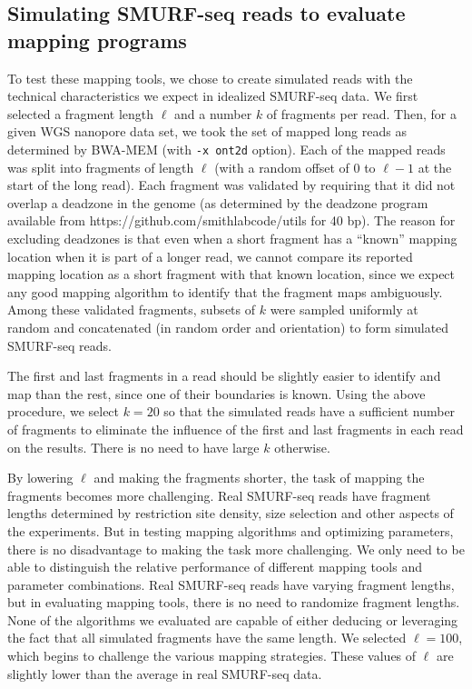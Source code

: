 \subsection{Simulating SMURF-seq reads to evaluate mapping programs}
To test these mapping tools, we chose to create simulated reads with the
technical characteristics we expect in idealized SMURF-seq data. We
first selected a fragment length $\ell$ and a number $k$ of fragments
per read. Then, for a given WGS nanopore data set, we took the set of
mapped long reads as determined by BWA-MEM (with \texttt{-x ont2d}
option).
Each of the mapped reads was split into fragments of length $\ell$ (with
a random offset of $0$ to $\ell-1$ at the start of the long read). Each
fragment was validated by requiring that it did not overlap a deadzone
in the genome (as determined by the deadzone program available from
https://github.com/smithlabcode/utils for 40 bp). The reason for
excluding deadzones is that even when a short fragment has a ``known''
mapping location when it is part of a longer read, we cannot compare its
reported mapping location as a short fragment with that known location,
since we expect any good mapping algorithm to identify that the fragment
maps ambiguously. Among these validated fragments, subsets of $k$ were
sampled uniformly at random and concatenated (in random order and
orientation) to form simulated SMURF-seq reads.

The first and last fragments in a read should be slightly easier to
identify and map than the rest, since one of their boundaries is
known. Using the above procedure, we select $k=20$ so that the
simulated reads have a sufficient number of fragments to eliminate the
influence of the first and last fragments in each read on the
results. There is no need to have large $k$ otherwise.

By lowering $\ell$ and making the fragments shorter, the task of
mapping the fragments becomes more challenging. Real SMURF-seq reads
have fragment lengths determined by restriction site density, size
selection and other aspects of the experiments. But in testing mapping
algorithms and optimizing parameters, there is no disadvantage to
making the task more challenging. We only need to be able to
distinguish the relative performance of different mapping tools and
parameter combinations. Real SMURF-seq reads have varying fragment
lengths, but in evaluating mapping tools, there is no need to
randomize fragment lengths. None of the algorithms we evaluated are
capable of either deducing or leveraging the fact that all simulated
fragments have the same length. We selected $\ell = 100$, which
begins to challenge the various mapping strategies. These values of
$\ell$ are slightly lower than the average in real SMURF-seq data.


